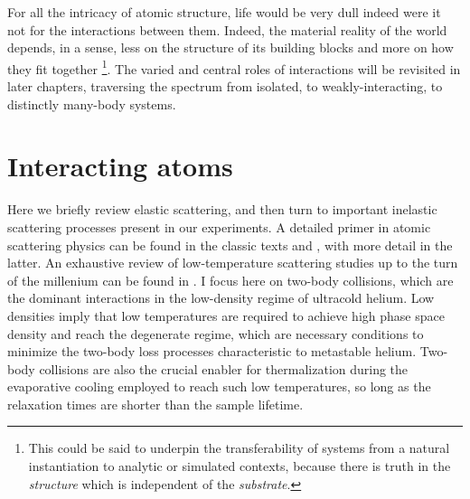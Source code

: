 	

	


	
	For all the intricacy of atomic structure, life would be very dull indeed were it not for the interactions between them.
	Indeed, the material reality of the world depends, in a sense, less on the structure of its building blocks and more on how they fit together \footnote{This could be said to underpin the transferability of systems from a natural instantiation to analytic or simulated contexts, because there is truth in the \emph{structure} which is independent of the \emph{substrate}.}.
	The varied and central roles of interactions will be revisited in later chapters, traversing the spectrum from isolated, to weakly-interacting, to distinctly many-body systems.
	

\section{Interacting atoms}

	
	Here we briefly review elastic scattering, and then turn to important inelastic scattering processes present in our experiments.
	A detailed primer in atomic scattering physics can be found in the classic texts \cite{PitaevskiiStringari} and \cite{PethickSmith}, with more detail in the latter.
	An exhaustive review of low-temperature scattering studies up to the turn of the millenium can be found in \cite{Weiner99}.
	I focus here on two-body collisions, which are the dominant interactions in the low-density regime of ultracold helium.
	Low densities imply that low temperatures are required to achieve high phase space density and reach the degenerate regime, which are necessary conditions to minimize the two-body loss processes characteristic to metastable helium.
	Two-body collisions are also the crucial enabler for thermalization during the evaporative cooling employed to reach such low temperatures, so long as the relaxation times are shorter than the sample lifetime.

